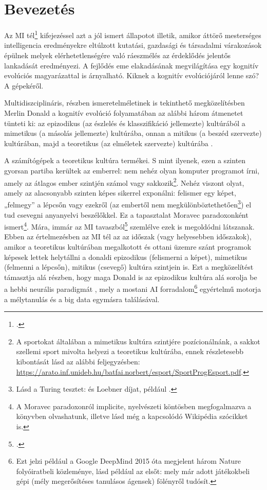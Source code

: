 \documentclass[a4paper]{article}
\begin{document}
\section{Bevezetés}

Az MI tél\footnote{\cite[24, 28]{RusselNorvig10}.} kifejezéssel azt a jól ismert állapotot illetik, amikor áttörő mesterséges intelligencia eredményekre eltúlzott kutatási, gazdasági és társadalmi várakozások épülnek melyek elérhetetlenségére való ráeszmélés az érdeklődés jelentős lankadását eredményezi. A fejlődés eme elakadásának megvilágítása egy kognitív evolúciós magyarázattal is árnyalható. Kiknek a kognitív evolúciójáról lenne szó? A gépekéről.

Multidiszciplináris, részben ismeretelméletinek is tekinthető megközelítésben Merlin Donald a kognitív evolúció folyamatában az alábbi három átmenetet tünteti ki: az epizodikus (az észlelés és klasszifikáció jellemezte) kultúrából a mimetikus (a másolás jellemezte) kultúrába, onnan a mitikus (a beszéd szervezte) kultúrában, majd a teoretikus (az elméletek szervezte) kultúrába \cite{Donald01}.

A számítógépek a teoretikus kultúra termékei. S mint ilyenek, ezen a szinten gyorsan partiba kerültek az emberrel: nem nehéz olyan komputer programot írni, amely az átlagos ember szintjén számol vagy sakkozik\footnote{A sportokat általában a mimetikus kultúra szintjére pozícionálnánk, a sakkot szellemi sport mivolta helyezi a teoretikus kultúrába, ennek részletesebb kibontását lásd az alábbi feljegyzésben: \url{https://arato.inf.unideb.hu/batfai.norbert/esport/SportProgEsport.pdf}.}. Nehéz viszont olyat, amely az alacsonyabb szinten képes sikerrel exponálni: felismer egy képet, „felmegy” a lépcsőn vagy ezekről (az embertől nem megkülönböztethetően\footnote{Lásd a Turing tesztet: \cite{Turing50} és Loebner díjat, például \cite{Shieber94}.}) el tud csevegni anyanyelvi beszélőkkel. Ez a tapasztalat Moravec paradoxonként ismert\footnote{A Moravec paradoxonról implicite, nyelvészeti köntösben megfogalmazva a \cite[190]{Pinker06} könyvben olvashatunk, illetve lásd még a kapcsolódó Wikipédia szócikket is.}. Mára, immár az MI tavaszból\footnote{\cite{Havenstein05}.} szemlélve ezek is megoldódni látszanak. Ebben az értelmezésben az MI tél az az időszak (vagy helyesebben időszakok), amikor a teoretikus kultúrában megalkotott és ottani üzemre szánt programok képesek lettek helytállni a donaldi epizodikus (felismerni a képet), mimetikus (felmenni a lépcsőn), mitikus (csevegő) kultúra szintjein is. Ezt a megközelítést támasztja alá részben, hogy maga Donald is az epizodikus kultúra alá sorolja be a hebbi neurális paradigmát \cite[313]{Donald01}, mely a mostani AI forradalom\footnote{Ezt jelzi például a Google DeepMind 2015 óta megjelent három Nature folyóiratbeli közleménye, lásd például az elsőt: \cite{ATARI} mely már adott játékokbeli gépi (mély megerősítéses tanulásos ágensek) fölényről tudósít.} egyértelmű motorja a mélytanulás és a big data egymásra találásával.
\end{document}
